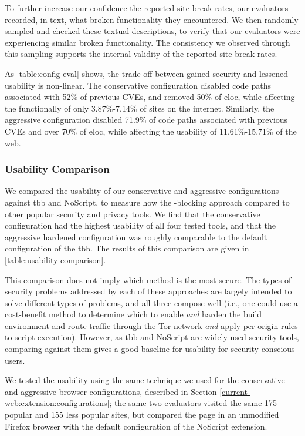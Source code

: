 To further increase our confidence the reported site-break rates, our evaluators
recorded, in text, what broken functionality they encountered.  We then
randomly sampled and checked these textual descriptions, to verify that our
evaluators were experiencing similar broken functionality.  The consistency we
observed through this sampling supports the internal validity of the reported
site break rates.

As \ref{table:config-eval} shows, the trade off between gained security and
lessened usability is non-linear.  The conservative configuration disabled code
paths associated with 52\% of previous CVEs, and removed 50\% of \gls{eloc},
while affecting the functionally of only 3.87\%-7.14\% of sites on the
internet.  Similarly, the aggressive configuration disabled 71.9\% of code
paths associated with previous CVEs and over 70\% of \gls{eloc}, while
affecting the usability of 11.61\%-15.71\% of the web.


\subsubsection{Usability Comparison}
\label{current-web:extension:usability-comparison}


We compared the usability of our conservative and aggressive configurations
against \gls{tbb} and NoScript, to measure how the \WAPI-blocking approach
compared to other popular security and privacy tools.  We find that the
conservative configuration had the highest usability of all four tested tools,
and that the aggressive hardened configuration was roughly comparable to the
default configuration of the \gls{tbb}.  The results of this comparison are
given in \ref{table:usability-comparison}.

This comparison does not imply which method is the most secure.  The types of
security problems addressed by each of these approaches are largely intended to
solve different types of problems, and all three compose well (i.e., one could
use a cost-benefit method to determine which \WASs to enable \textit{and}
harden the build environment and route traffic through the Tor network
\textit{and} apply per-origin rules to script execution).  However, as
\gls{tbb} and NoScript are widely used security tools, comparing against them
gives a good baseline for usability for security conscious users.

We tested the usability using the same technique we used for the conservative
and aggressive browser configurations, described in Section
\ref{current-web:extension:configurations}; the same two evaluators visited the
same 175 popular and 155 less popular sites, but compared the page in
an unmodified Firefox browser with the default configuration of the NoScript
extension.

